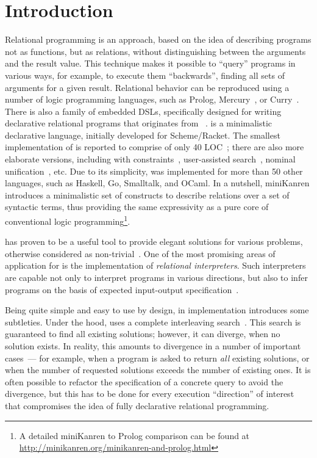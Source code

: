 \section{Introduction}

Relational programming is an approach, based on the idea of describing programs not as functions, but 
as relations, without distinguishing between the arguments and the result value. This technique makes it 
possible to ``query'' programs in various ways, for example, to execute them ``backwards'', finding
all sets of arguments for a given result. Relational behavior can be reproduced using a number of
logic programming languages, such as Prolog, Mercury~\cite{Mercury}, 
or Curry~\cite{Curry}. 
There is also a family of embedded DSLs, specifically designed for writing declarative relational
programs that originates from \miniKanren~\cite{TRS}. \miniKanren is a minimalistic 
declarative language, initially developed for Scheme/Racket. The smallest implementation of \miniKanren 
is reported to comprise of only 40 LOC~\cite{MicroKanren,2016}; there are also more elaborate versions, including
\miniKanren with constraints~\cite{CKanren,CKanren1}, user-assisted search~\cite{Guided}, nominal unification~\cite{AlphaKanren},
etc. Due to its simplicity, \miniKanren was implemented for more than 50 other languages, such as
Haskell, Go, Smalltalk, and OCaml. In a nutshell, miniKanren introduces a minimalistic set of constructs to describe
relations over a set of syntactic terms, thus providing the same expressivity as a pure core of conventional
logic programming\footnote{A detailed miniKanren to Prolog comparison can be found at \url{http://minikanren.org/minikanren-and-prolog.html}}. 

\miniKanren has proven to be a useful tool to provide elegant solutions for various problems, otherwise considered as
non-trivial~\cite{WillThesis}. One of the most promising areas of application for \miniKanren is the implementation of
\emph{relational interpreters}. Such interpreters are capable not only to interpret programs in various directions, but also
to infer programs on the basis of expected input-output specification~\cite{Untagged}.

Being quite simple and easy to use by design, in implementation \miniKanren introduces some subtleties. Under the hood, \miniKanren 
uses a complete interleaving search~\cite{Search}. This search is guaranteed to find all existing solutions; however, it can diverge, when no 
solution exists. In reality, this amounts to divergence in a number of important cases~--- for example, when a program is asked to 
return \emph{all} existing solutions, or when the number of requested solutions exceeds the number of existing ones.
It is often possible to refactor the specification of a concrete query to avoid the divergence, but this has to be done for every execution
``direction'' of interest that compromises the idea of fully declarative relational programming.

